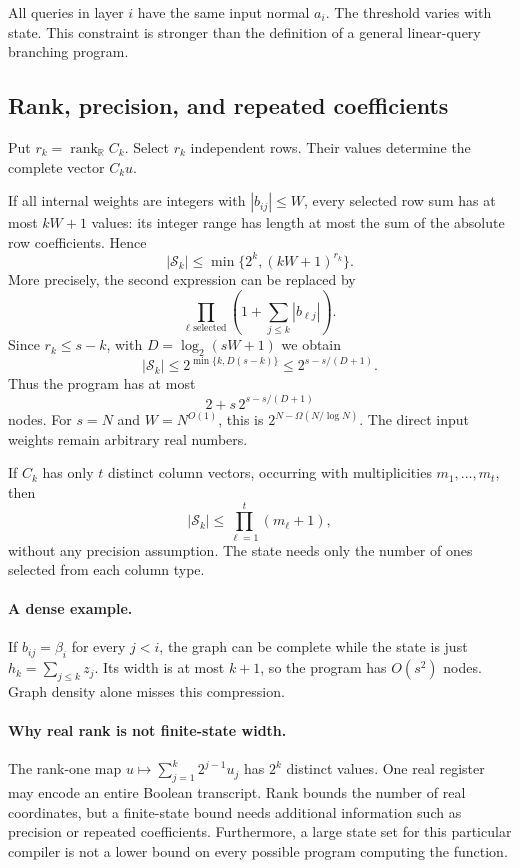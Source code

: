 \documentclass[11pt]{article}
\theoremstyle{definition}
\newcommand{\R}{\mathbb R}
\newcommand{\rank}{\operatorname{rank}}
\begin{document}
All queries in layer \(i\) have the same input normal \(a_i\). The threshold varies with state. This constraint is stronger than the definition of a general linear-query branching program.

\subsection{Rank, precision, and repeated coefficients}
Put \(r_k=\rank_\R C_k\). Select \(r_k\) independent rows. Their values determine the complete vector \(C_ku\).

If all internal weights are integers with \(|b_{ij}|\le W\), every selected row sum has at most \(kW+1\) values: its integer range has length at most the sum of the absolute row coefficients. Hence
\[
 |\mathcal S_k|
 \le\min\{2^k,(kW+1)^{r_k}\}.                            \tag{9}
\]
More precisely, the second expression can be replaced by
\[
 \prod_{\ell\text{ selected}}\left(1+\sum_{j\le k}|b_{\ell j}|\right).
\]
Since \(r_k\le s-k\), with \(D=\log_2(sW+1)\) we obtain
\[
 |\mathcal S_k|\le2^{\min\{k,D(s-k)\}}
 \le2^{s-s/(D+1)}.
\]
Thus the program has at most
\[
 2+s\,2^{s-s/(D+1)}                                      \tag{10}
\]
nodes. For \(s=N\) and \(W=N^{O(1)}\), this is \(2^{N-\Omega(N/\log N)}\).
The direct input weights remain arbitrary real numbers.

If \(C_k\) has only \(t\) distinct column vectors, occurring with multiplicities \(m_1,\ldots,m_t\), then
\[
 |\mathcal S_k|\le\prod_{\ell=1}^t(m_\ell+1),              \tag{11}
\]
without any precision assumption. The state needs only the number of ones selected from each column type.

\paragraph{A dense example.}
If \(b_{ij}=\beta_i\) for every \(j<i\), the graph can be complete while the state is just \(h_k=\sum_{j\le k}z_j\). Its width is at most \(k+1\), so the program has \(O(s^2)\) nodes. Graph density alone misses this compression.

\paragraph{Why real rank is not finite-state width.}
The rank-one map \(u\mapsto\sum_{j=1}^k2^{j-1}u_j\) has \(2^k\) distinct values. One real register may encode an entire Boolean transcript. Rank bounds the number of real coordinates, but a finite-state bound needs additional information such as precision or repeated coefficients. Furthermore, a large state set for this particular compiler is not a lower bound on every possible program computing the function.
\end{document}
